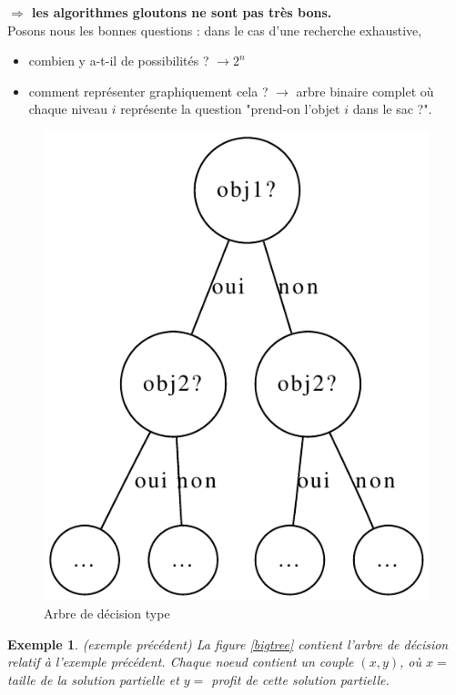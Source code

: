 \documentclass{article}
\newtheorem{exemple}{Exemple}[section]
\begin{document}
\begin{sffamily}
\textbf{$\Rightarrow$ les algorithmes gloutons ne sont pas très bons.} \\

\noindent Posons nous les bonnes questions : dans le cas d'une recherche exhaustive, 
\begin{itemize}
\item combien y a-t-il de possibilités ? $\rightarrow 2^n$
\item comment représenter graphiquement cela ? $\rightarrow$ arbre binaire complet où chaque niveau $i$ représente la question "prend-on 
l'objet $i$ dans le sac ?".
\end{itemize}

\begin{figure}[h!]
    \begin{center}
    \includegraphics[scale=0.5]{arbredec1.pdf}
    \caption{Arbre de décision type}
    \end{center}	
\end{figure}

\begin{exemple}(exemple précédent) La figure \ref{bigtree} contient l'arbre de décision relatif à l'exemple précédent. Chaque noeud contient 
un couple $(x,y)$, où $x=$ taille de la solution partielle et $y=$ profit de cette solution partielle. \\


\end{exemple}
\end{sffamily}
\end{document}
